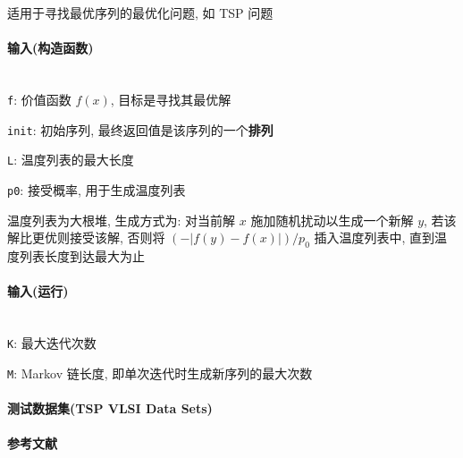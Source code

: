 适用于寻找最优序列的最优化问题, 如 TSP 问题

\paragraph{输入(构造函数)}~\\

\verb|f|: 价值函数 \(f(x)\), 目标是寻找其最优解

\verb|init|: 初始序列, 最终返回值是该序列的一个\textbf{排列}

\verb|L|: 温度列表的最大长度

\verb|p0|: 接受概率, 用于生成温度列表

温度列表为大根堆, 生成方式为: 对当前解 \(x\) 施加随机扰动以生成一个新解 \(y\), 若该解比更优则接受该解, 否则将 \((-|f(y)-f(x)|)/p_0\) 插入温度列表中, 直到温度列表长度到达最大为止

\paragraph{输入(运行)}~\\

\verb|K|: 最大迭代次数

\verb|M|: Markov 链长度, 即单次迭代时生成新序列的最大次数

\paragraph{测试数据集(TSP VLSI Data Sets)} \cite{tspvlsidatasets}

\paragraph{参考文献} \cite{zhan2016list}
